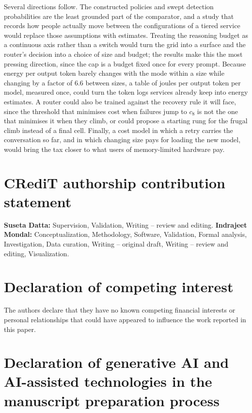 \documentclass[final,5p,times,twocolumn]{elsarticle}
\theoremstyle{plain}
\begin{document}
Several directions follow. The constructed policies and swept detection
probabilities are the least grounded part of the comparator, and a study that
records how people actually move between the configurations of a tiered
service would replace those assumptions with estimates. Treating the
reasoning budget as a continuous axis rather than a switch would turn the
grid into a surface and the router's decision into a choice of size and
budget; the results make this the most pressing direction, since the cap is a
budget fixed once for every prompt. Because energy per output token barely
changes with the mode within a size while changing by a factor of 6.6 between
sizes, a table of joules per output token per model, measured once, could
turn the token logs services already keep into energy estimates. A router
could also be trained against the recovery rule it will face, since the
threshold that minimises cost when failures jump to $c_8$ is not the one that
minimises it when they climb, or could propose a starting rung for the frugal
climb instead of a final cell. Finally, a cost model in which a retry carries
the conversation so far, and in which changing size pays for loading the new
model, would bring the tax closer to what users of memory-limited hardware
pay.


\section*{CRediT authorship contribution statement}

\textbf{Suseta Datta:} Supervision, Validation, Writing -- review and
editing.
\textbf{Indrajeet Mondal:} Conceptualization, Methodology, Software,
Validation, Formal analysis, Investigation, Data curation, Writing --
original draft, Writing -- review and editing, Visualization.

\section*{Declaration of competing interest}

The authors declare that they have no known competing financial interests or
personal relationships that could have appeared to influence the work
reported in this paper.

\section*{Declaration of generative AI and AI-assisted technologies in the
manuscript preparation process}
\end{document}

